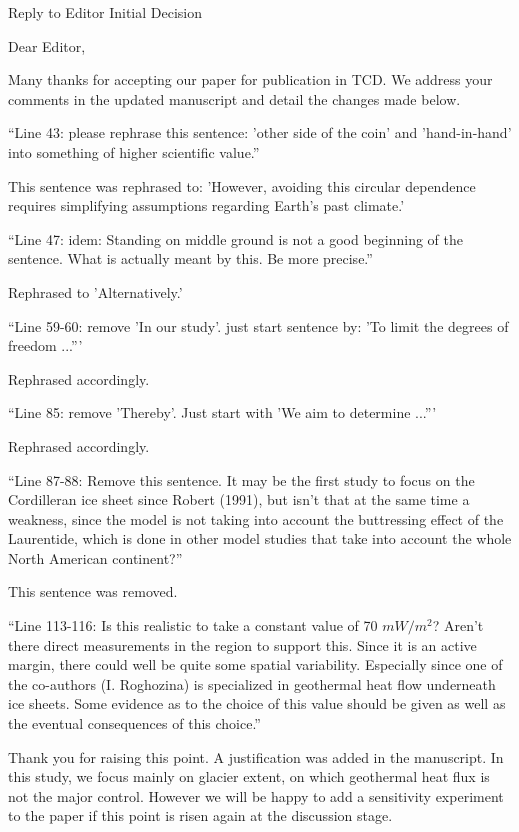 \documentclass{letter}
\newcommand{\rev}[0]{\color{blue!50!black}\it}
\newcommand{\revpoint}[1]{{\rev\item``#1''}}
\begin{document}
\begin{letter}{Reply to Editor Initial Decision}

\opening{Dear Editor,}

Many thanks for accepting our paper for publication in TCD. We address your comments in the updated manuscript and detail the changes made below.


\begin{itemize}

\revpoint{Line 43: please rephrase this sentence: 'other side of the coin' and 'hand-in-hand' into something of higher scientific value.}

This sentence was rephrased to: 'However, avoiding this circular dependence requires simplifying assumptions regarding Earth's past climate.'

\revpoint{Line 47: idem: Standing on middle ground is not a good beginning of the sentence. What is actually meant by this. Be more precise.}

Rephrased to 'Alternatively.'

\revpoint{Line 59-60: remove 'In our study'. just start sentence by: 'To limit the degrees of freedom ...'}

Rephrased accordingly.

\revpoint{Line 85: remove 'Thereby'. Just start with 'We aim to determine ...'}

Rephrased accordingly.

\revpoint{Line 87-88: Remove this sentence. It may be the first study to focus on the Cordilleran ice sheet since Robert (1991), but isn't that at the same time a weakness, since the model is not taking into account the buttressing effect of the Laurentide, which is done in other model studies that take into account the whole North American continent?}

This sentence was removed.

\revpoint{Line 113-116: Is this realistic to take a constant value of 70 $mW/m^2$? Aren't there direct measurements in the region to support this. Since it is an active margin, there could well be quite some spatial variability. Especially since one of the co-authors (I. Roghozina) is specialized in geothermal heat flow underneath ice sheets. Some evidence as to the choice of this value should be given as well as the eventual consequences of this choice.}

Thank you for raising this point. A justification was added in the manuscript. In this study, we focus mainly on glacier extent, on which geothermal heat flux is not the major control. However we will be happy to add a sensitivity experiment to the paper if this point is risen again at the discussion stage.


\end{itemize}
\end{letter}
\end{document}
